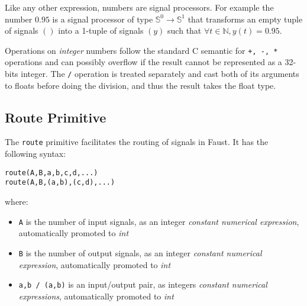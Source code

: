 Like any other \faust expression, numbers are signal processors. For example the number $0.95$ is a signal processor of type $\mathbb{S}^{0}\rightarrow\mathbb{S}^{1}$ that transforms an empty tuple of signals $()$ into a 1-tuple of signals $(y)$ such that $\forall t\in\mathbb{N}, y(t)=0.95$.

Operations on \textit{integer} numbers follow the standard C semantic for \lstinline'+, -, *' operations and can possibly overflow if the result cannot be represented as a 32-bits integer. The \lstinline'/' operation is treated separately and cast both of its arguments to floats before doing the division, and thus the result takes the float type.



\subsection{Route Primitive }

The  \lstinline'route' primitive facilitates the routing of signals in Faust. It has the following syntax:

\begin{lstlisting}
route(A,B,a,b,c,d,...)
route(A,B,(a,b),(c,d),...)
\end{lstlisting}

where:

\begin{itemize} 
\item \lstinline'A' is the number of input signals, as an integer \textit{constant numerical expression}, automatically promoted to \textit{int}
\item \lstinline'B' is the number of output signals, as an integer \textit{constant numerical expression}, automatically promoted to \textit{int}
\item \lstinline'a,b / (a,b)' is an input/output pair, as integers \textit{constant numerical expressions}, automatically promoted to \textit{int}
\end{itemize}

